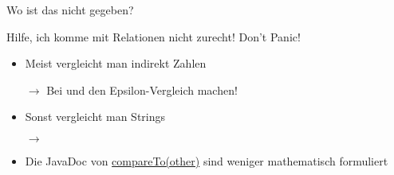 \documentclass[usepdftitle=false,hyperref={pdfpagelabels=false}]{beamer}
\begin{document}
\begin{frame}{Wo ist das nicht gegeben?}
    \begin{itemize}
    \end{itemize}
\end{frame}

\begin{frame}{Hilfe, ich komme mit Relationen nicht zurecht!}
    Don't Panic!

    \begin{itemize}
        \item Meist vergleicht man indirekt Zahlen
        \item[$\rightarrow$] Bei  und  den Epsilon-Vergleich machen!
        \item Sonst vergleicht man Strings
        \item[$\rightarrow$] 
        \item Die JavaDoc von \href{http://docs.oracle.com/javase/7/docs/api/java/lang/Comparable.html\#compareTo\%28T\%29}{compareTo(other)} 
              sind weniger mathematisch formuliert
    \end{itemize}
\end{frame}
\end{document}
